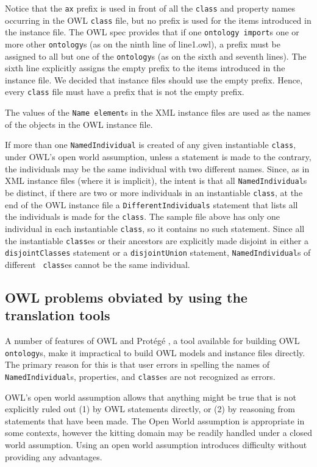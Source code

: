 \documentclass[preprint,12pt]{elsarticle}
\begin{document}
Notice that the {\tt ax} prefix is used in front of all the {\tt class} and
property names occurring in the OWL {\tt class} file, but no prefix is used
for the items introduced in the instance file. The OWL spec provides that
if one {\tt ontology import}s one or more other {\tt ontology}s (as on the
ninth line of line1.owl), a prefix must be assigned to all but one of the
{\tt ontology}s (as on the sixth and seventh lines). The sixth line
explicitly assigns the empty prefix to the items introduced in the instance
file. We decided that instance files should use the empty prefix. Hence,
every {\tt class} file must have a prefix that is not the empty prefix.

The values of the {\tt Name element}s in the XML instance files are used as
the names of the objects in the OWL instance file.

If more than one {\tt NamedIndividual} is created of any given instantiable
{\tt class}, under OWL's open world assumption, unless a statement is made
to the contrary, the individuals may be the same individual with two
different names. Since, as in XML instance files (where it is implicit),
the intent is that all {\tt NamedIndividual}s be distinct, if there are two
or more individuals in an instantiable {\tt class}, at the end of the OWL
instance file a {\tt DifferentIndividuals} statement that lists all the
individuals is made for the {\tt class}. The sample file above has only one
individual in each instantiable {\tt class}, so it contains no such
statement. Since all the instantiable {\tt class}es or their ancestors are
explicitly made disjoint in either a {\tt disjointClasses} statement or a
{\tt disjointUnion} statement, {\tt NamedIndividual}s of different {\tt
  class}es cannot be the same individual.

\subsection{OWL problems obviated by using the translation tools}
\label{problemsGone}

A number of features of OWL \cite{owlPrimer,owlSpecification} and
Prot\'eg\'e \cite{protege}, a tool available for building OWL {\tt
  ontology}s, make it impractical to build OWL models and instance files
directly. The primary reason for this is that user errors in spelling the
names of {\tt NamedIndividual}s, properties, and {\tt class}es are not
recognized as errors.

OWL's open world assumption allows that anything might be true that is not
explicitly ruled out (1) by OWL statements directly, or (2) by reasoning
from statements that have been made. The Open World assumption is
appropriate in some contexts, however the kitting domain may be readily
handled under a closed world assumption. Using an open world assumption
introduces difficulty without providing any advantages.
\end{document}
